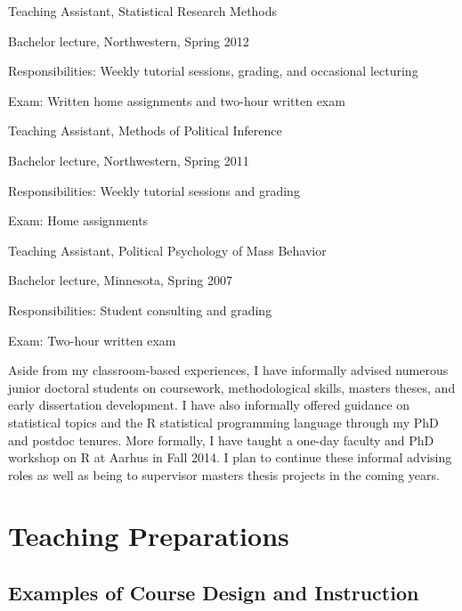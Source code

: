 \documentclass[12pt]{article}
\begin{document}
\begin{itemize*}
\item Teaching Assistant, Statistical Research Methods
	\begin{itemize*}
	\item Bachelor lecture, Northwestern, Spring 2012
	\item Responsibilities: Weekly tutorial sessions, grading, and occasional lecturing
	\item Exam: Written home assignments and two-hour written exam
	\end{itemize*}
\item Teaching Assistant, Methods of Political Inference
	\begin{itemize*}
	\item Bachelor lecture, Northwestern, Spring 2011
	\item Responsibilities: Weekly tutorial sessions and grading
	\item Exam: Home assignments
	\end{itemize*}
\item Teaching Assistant, Political Psychology of Mass Behavior
	\begin{itemize*}
	\item Bachelor lecture, Minnesota, Spring 2007
	\item Responsibilities: Student consulting and grading
	\item Exam: Two-hour written exam
	\end{itemize*}
\end{itemize*}

Aside from my classroom-based experiences, I have informally advised numerous junior doctoral students on coursework, methodological skills, masters theses, and early dissertation development. I have also informally offered guidance on statistical topics and the R statistical programming language through my PhD and postdoc tenures. More formally, I have taught a one-day faculty and PhD workshop on R at Aarhus in Fall 2014. I plan to continue these informal advising roles as well as being to supervisor masters thesis projects in the coming years.

\clearpage
\section{Teaching Preparations}



\subsection{Examples of Course Design and Instruction}
\end{document}
